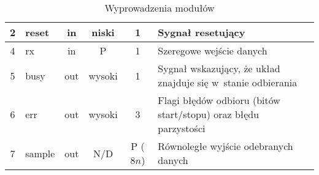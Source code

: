 \begin{table}[h]
\begin{tabular}{|c|l|c|c|c|m{4.5cm}|}
2            & reset          & in           & niski                 & 1                & Sygnał resetujący                                                                                                                                  \\ \hline
4            & rx             & in           & P                     & 1                & Szeregowe wejście danych                                                                                                                           \\ \hline
5            & busy           & out          & wysoki                & 1                & Sygnał wskazujący, że układ znajduje się w~stanie odbierania                                                                                       \\ \hline
6            & err            & out          & wysoki                & 3                & Flagi błędów odbioru (bitów start/stopu) oraz błędu parzystości                                                                                    \\ \hline
7            & sample         & out          & N/D                   & P ($8n$)         & Równoległe wyjście odebranych danych                                                                                                               \\ \hline
\end{tabular}
\caption{Wyprowadzenia modułów}
\end{table}

